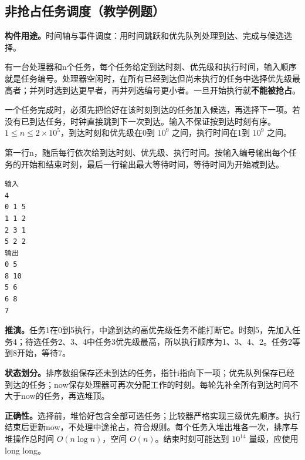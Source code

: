 \subsection{非抢占任务调度（教学例题）}
\noindent\textbf{构件用途。}时间轴与事件调度：用时间跳跃和优先队列处理到达、完成与候选选择。

有一台处理器和n个任务，每个任务给定到达时刻、优先级和执行时间，输入顺序就是任务编号。处理器空闲时，在所有已经到达但尚未执行的任务中选择优先级最高者；并列时选到达更早者，再并列选编号更小者。一旦开始执行就\textbf{不能被抢占}。

一个任务完成时，必须先把恰好在该时刻到达的任务加入候选，再选择下一项。若没有已到达任务，时钟直接跳到下一次到达。输入不保证按到达时刻有序。$1\le n\le2\times10^5$，到达时刻和优先级在0到 $10^9$ 之间，执行时间在1到 $10^9$ 之间。

第一行n，随后每行依次给到达时刻、优先级、执行时间。按输入编号输出每个任务的开始和结束时刻，最后一行输出最大等待时间，等待时间为开始减到达。
\begin{verbatim}
输入
4
0 1 5
1 1 2
2 3 1
5 2 2
输出
0 5
8 10
5 6
6 8
7
\end{verbatim}

\noindent\textbf{推演。}任务1在0到5执行，中途到达的高优先级任务不能打断它。时刻5，先加入任务4；待选任务2、3、4中任务3优先级最高，所以执行顺序为1、3、4、2。任务2等到8开始，等待7。

\noindent\textbf{状态划分。}排序数组保存还未到达的任务，指针i指向下一项；优先队列保存已经到达的任务；now保存处理器可再次分配工作的时刻。每轮先补全所有到达时间不大于now的任务，再选堆顶。

\noindent\textbf{正确性。}选择前，堆恰好包含全部可选任务；比较器严格实现三级优先顺序。执行结束后更新now，不处理中途抢占，符合规则。每个任务入堆出堆各一次，排序与堆操作总时间 $O(n\log n)$，空间 $O(n)$。结束时刻可能达到 $10^{14}$ 量级，应使用long long。
